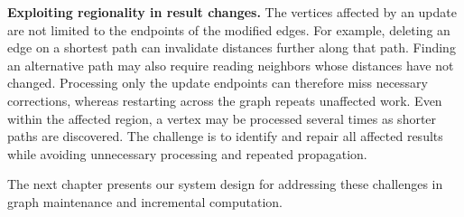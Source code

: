 \textbf{Exploiting regionality in result changes.} The vertices affected by an update are not limited to the endpoints of the modified edges. For example, deleting an edge on a shortest path can invalidate distances further along that path. Finding an alternative path may also require reading neighbors whose distances have not changed. Processing only the update endpoints can therefore miss necessary corrections, whereas restarting across the graph repeats unaffected work. Even within the affected region, a vertex may be processed several times as shorter paths are discovered. The challenge is to identify and repair all affected results while avoiding unnecessary processing and repeated propagation.

The next chapter presents our system design for addressing these challenges in graph maintenance and incremental computation.

